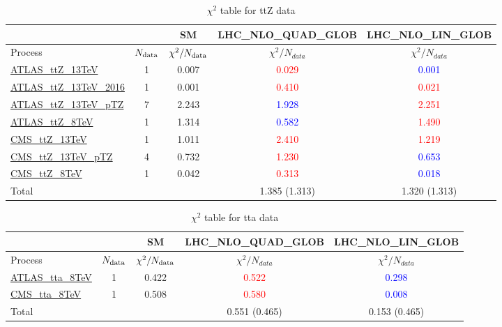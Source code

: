 \documentclass{article}
\begin{document}
\begin{table}[H]
\centering
\begin{tabular}{|l|c|c|c|c|}
\hline
 \multicolumn{2}{|c|}{} & SM& LHC_NLO_QUAD_GLOB& LHC_NLO_LIN_GLOB\\ \hline
Process & $N_{\rm data}$ & $\chi^ 2/N_{\rm data}$& $\chi^ 2/N_{data}$& $\chi^ 2/N_{data}$\\ \hline
\href{https://arxiv.org}{ATLAS_ttZ_13TeV} & 1 & 0.007 & \textcolor{red}                            {0.029} & \textcolor{blue}                            {0.001} \\ \hline
\href{https://arxiv.org}{ATLAS_ttZ_13TeV_2016} & 1 & 0.001 & \textcolor{red}                            {0.410} & \textcolor{red}                            {0.021} \\ \hline
\href{https://arxiv.org}{ATLAS_ttZ_13TeV_pTZ} & 7 & 2.243 & \textcolor{blue}                            {1.928} & \textcolor{red}                            {2.251} \\ \hline
\href{https://arxiv.org}{ATLAS_ttZ_8TeV} & 1 & 1.314 & \textcolor{blue}                            {0.582} & \textcolor{red}                            {1.490} \\ \hline
\href{https://arxiv.org}{CMS_ttZ_13TeV} & 1 & 1.011 & \textcolor{red}                            {2.410} & \textcolor{red}                            {1.219} \\ \hline
\href{https://arxiv.org}{CMS_ttZ_13TeV_pTZ} & 4 & 0.732 & \textcolor{red}                            {1.230} & \textcolor{blue}                            {0.653} \\ \hline
\href{https://arxiv.org}{CMS_ttZ_8TeV} & 1 & 0.042 & \textcolor{red}                            {0.313} & \textcolor{blue}                            {0.018} \\ \hline
\hline Total & &  & 1.385 (1.313) & 1.320 (1.313) \\ \hline
\end{tabular}
\caption{$\chi^2$ table for ttZ data}
\end{table}
\begin{table}[H]
\centering
\begin{tabular}{|l|c|c|c|c|}
\hline
 \multicolumn{2}{|c|}{} & SM& LHC_NLO_QUAD_GLOB& LHC_NLO_LIN_GLOB\\ \hline
Process & $N_{\rm data}$ & $\chi^ 2/N_{\rm data}$& $\chi^ 2/N_{data}$& $\chi^ 2/N_{data}$\\ \hline
\href{https://arxiv.org}{ATLAS_tta_8TeV} & 1 & 0.422 & \textcolor{red}                            {0.522} & \textcolor{blue}                            {0.298} \\ \hline
\href{https://arxiv.org}{CMS_tta_8TeV} & 1 & 0.508 & \textcolor{red}                            {0.580} & \textcolor{blue}                            {0.008} \\ \hline
\hline Total & &  & 0.551 (0.465) & 0.153 (0.465) \\ \hline
\end{tabular}
\caption{$\chi^2$ table for tta data}
\end{table}
\end{document}
